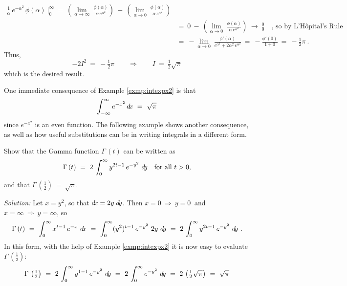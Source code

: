 \begin{exmp}
\begin{align*}
\frac{1}{\alpha}\,e^{-\alpha^2}\,\phi(\alpha)~\Biggr|_0^{\infty}
~=~ \left(\lim_{\alpha \to \infty}~\frac{\phi(\alpha)}{\alpha \,e^{\alpha^2}}\right) ~-~
    \left(\lim_{\alpha \to 0}~\frac{\phi(\alpha)}{\alpha\,e^{\alpha^2}}\right)\\[6pt]
&=~ 0 ~-~ \left(\lim_{\alpha \to 0}~\frac{\phi(\alpha)}{\alpha\,e^{\alpha^2}}\right)
 ~\to~ \frac{0}{0} \quad\text{, so by L'H\^{o}pital's Rule}\\[6pt]
&=~ -\lim_{\alpha \to 0}~\frac{\phi'(\alpha)}{e^{\alpha^2} + 2\alpha^2\,e^{\alpha^2}}
~=~ -\frac{\phi'(0)}{1+0} ~=~ -\tfrac{1}{2}\pi ~.
\end{align*}
Thus,
\[
-2I^2 ~=~ -\tfrac{1}{2}\pi \qquad\Rightarrow\qquad I ~=~ \tfrac{1}{2}\sqrt{\pi}
\]
which is the desired result.
\end{exmp}
\divider
\newpage
One immediate consequence of Example \ref{exmp:intexpx2} is that
\[
\int_{-\infty}^{\infty} e^{-x^2} \,d\!x ~=~ \sqrt{\pi}
\]
since $e^{-x^2}$ is an even function. The following example shows another
consequence, as well as how useful substitutions can be in writing integrals in
a different form.

\begin{exmp}\label{exmp:intgamma1}
\noindent Show that the Gamma function $\Gamma\,(t)$ can be written as
\[
\Gamma\,(t) ~=~ 2\,\int_0^{\infty} y^{2t-1} \, e^{-y^2} ~d\!y \quad\text{for all $t > 0$,}
\]
and that $\Gamma\,\left(\tfrac{1}{2}\right) ~=~ \sqrt{\pi}$.\vspace{1mm}
\par\noindent\emph{Solution:} Let $x = y^2$, so that $d\!x = 2y\;d\!y$. Then
$x=0~\Rightarrow~y=0~$ and $x=\infty~\Rightarrow~y=\infty$, so
\[
\Gamma\,(t) ~=~ \int_0^{\infty} x^{t-1} \, e^{-x} ~d\!x
~=~ \int_0^{\infty} (y^2)^{t-1}\,e^{-y^2}~2y~d\!y\\[6pt]
~=~ 2\,\int_0^{\infty} y^{2t-1} \, e^{-y^2} ~d\!y ~.
\]
In this form, with the help of Example \ref{exmp:intexpx2} it is now easy to
evaluate $\Gamma\,\left(\tfrac{1}{2}\right)$:
\[
\Gamma\,\left(\tfrac{1}{2}\right) ~=~ 2\,\int_0^{\infty} y^{1-1} \, e^{-y^2} ~d\!y ~=~
2\,\int_0^{\infty} e^{-y^2}~d\!y ~=~ 2\,\left(\tfrac{1}{2}\sqrt{\pi}\right) ~=~ \sqrt{\pi}
\]
\end{exmp}
\divider
\vspace{2mm}

